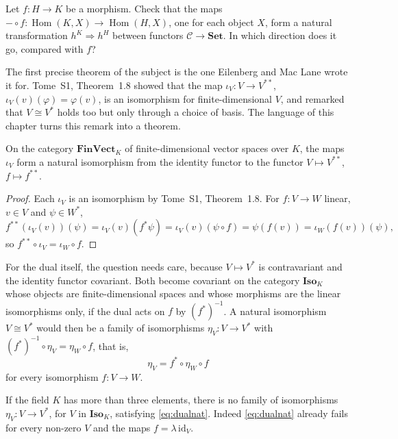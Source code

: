 \begin{think}
Let $f\colon H\to K$ be a morphism. Check that the maps $-\circ f\colon\operatorname{Hom}(K,X)\to\operatorname{Hom}(H,X)$, one for each object $X$, form a natural transformation $h^K\Rightarrow h^H$ between functors
$\mathcal C\to\mathbf{Set}$. In which direction does it go, compared with $f$?
\end{think}

The first precise theorem of the subject is the one Eilenberg and Mac Lane wrote it for. Tome~S1, Theorem~1.8 showed that the map $\iota_V\colon V\to V^{**}$, $\iota_V(v)(\varphi)=\varphi(v)$,
is an isomorphism for finite-dimensional $V$, and remarked that $V\cong V^*$ holds too but only through a choice of basis. The language of this chapter turns this remark into a theorem.

\begin{theorem}\label{thm:bidualnat}
On the category $\mathbf{FinVect}_K$ of finite-dimensional vector spaces over $K$, the maps $\iota_V$ form a natural isomorphism from the identity functor to the functor $V\mapsto V^{**}$,
$f\mapsto f^{**}$.
\end{theorem}

\begin{proof}
Each $\iota_V$ is an isomorphism by Tome~S1, Theorem~1.8. For $f\colon V\to W$ linear, $v\in V$ and $\psi\in W^*$,
\[f^{**}(\iota_V(v))(\psi)=\iota_V(v)(f^*\psi)=\iota_V(v)(\psi\circ f)=\psi(f(v))=\iota_W(f(v))(\psi),\]
so $f^{**}\circ\iota_V=\iota_W\circ f$.
\end{proof}

For the dual itself, the question needs care, because $V\mapsto V^*$ is contravariant and the identity functor covariant. Both become covariant on the category $\mathbf{Iso}_K$ whose objects are
finite-dimensional spaces and whose morphisms are the linear isomorphisms only, if the dual acts on $f$ by $(f^*)^{-1}$. A natural isomorphism $V\cong V^*$ would then be a family of
isomorphisms $\eta_V\colon V\to V^*$ with $(f^*)^{-1}\circ\eta_V=\eta_W\circ f$, that is,
\begin{equation}\label{eq:dualnat}
\eta_V=f^*\circ\eta_W\circ f
\end{equation}
for every isomorphism $f\colon V\to W$.

\begin{theorem}\label{thm:notnatural}
If the field $K$ has more than three elements, there is no family of isomorphisms $\eta_V\colon V\to V^*$, for $V$ in $\mathbf{Iso}_K$, satisfying \eqref{eq:dualnat}. Indeed \eqref{eq:dualnat} already fails
for every non-zero $V$ and the maps $f=\lambda\,\mathrm{id}_V$.
\end{theorem}


